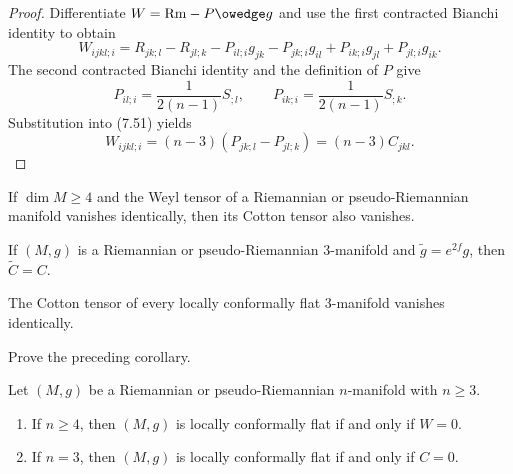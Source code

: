 \begin{proof}
\sketch
Differentiate $W=\mathrm{Rm}-P\owedge g$ and use the first contracted Bianchi
identity to obtain
\begin{equation}
W_{ijkl;i}=R_{jk;l}-R_{jl;k}-P_{il;i}g_{jk}-P_{jk;i}g_{il}
+P_{ik;i}g_{jl}+P_{jl;i}g_{ik}. \tag{7.51}
\end{equation}
The second contracted Bianchi identity and the definition of $P$ give
\[
P_{il;i}=\frac1{2(n-1)}S_{;l},
\qquad
P_{ik;i}=\frac1{2(n-1)}S_{;k}.
\]
Substitution into (7.51) yields
\[
W_{ijkl;i}=(n-3)(P_{jk;l}-P_{jl;k})=(n-3)C_{jkl}.
\]
\end{proof}

\begin{corollary}
\label{cor:weyl-cotton-vanish-dimension-4}
If $\dim M\geq4$ and the Weyl tensor of a Riemannian or pseudo-Riemannian
manifold vanishes identically, then its Cotton tensor also vanishes.
\end{corollary}

\begin{proposition}
\label{prop:conformal-invariance-cotton-dim3}
If $(M,g)$ is a Riemannian or pseudo-Riemannian $3$-manifold and
$\widetilde g=e^{2f}g$, then $\widetilde C=C$.
\end{proposition}

\begin{corollary}
\label{cor:cotton-tensor-vanishes-conformally-flat}
The Cotton tensor of every locally conformally flat $3$-manifold vanishes
identically.
\end{corollary}

\begin{exercise}
\label{exer:prove-cotton-tensor-vanishes}
Prove the preceding corollary.
\end{exercise}

\begin{theorem}
\label{thm:weyl-schouten}
Let $(M,g)$ be a Riemannian or pseudo-Riemannian $n$-manifold with $n\geq3$.
\begin{enumerate}
\item[(a)] If $n\geq4$, then $(M,g)$ is locally conformally flat if and only
if $W=0$.
\item[(b)] If $n=3$, then $(M,g)$ is locally conformally flat if and only if
$C=0$.
\end{enumerate}
\end{theorem}

